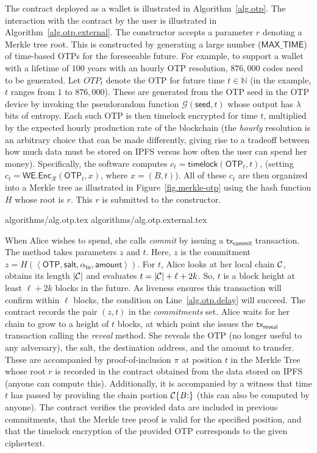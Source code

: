 The contract deployed as a wallet is illustrated in Algorithm~\ref{alg.otp}.
The interaction with the contract by the user is illustrated in Algorithm~\ref{alg.otp.external}.
The constructor accepts a parameter $r$
denoting a Merkle tree root. This is constructed by generating a large number ($\textsf{MAX\_TIME}$)
of time-based OTPs for the foreseeable future. For example, to support a wallet with
a lifetime of $100$ years with an hourly OTP resolution, $876{,}000$ codes need to
be generated. Let ${OTP}_t$ denote the OTP for future time $t \in \mathbb{N}$ (in
the example, $t$ ranges from $1$ to $876{,}000$). These are generated from
the OTP seed in the OTP device by invoking the pseudorandom function
$\mathcal{G}(\textsf{seed}, t)$ whose output has $\lambda$ bits of entropy.
Each such OTP is then timelock encrypted for time $t$, multiplied by the expected
hourly production rate of the blockchain (the \emph{hourly} resolution is an arbitrary
choice that can be made differently, giving rise to a tradeoff between how much
data must be stored on IPFS versus how often the user can spend her money).
Specifically, the software computes $c_t = \textsf{timelock}(\textsf{OTP}_t, t)$,
(setting $c_t = \textsf{WE.Enc}_\mathcal{R}(\textsf{OTP}_t, x)$, where $x = (B, t)$).
All of these $c_t$ are then organized into a Merkle tree as illustrated in
Figure~\ref{fig.merkle-otp}
using the hash function $H$ whose root is $r$. This $r$ is submitted
to the constructor.

{algorithms/alg.otp.tex}
{algorithms/alg.otp.external.tex}

When Alice wishes to spend, she calls \emph{commit} by issuing a
$\textsf{tx}_\textsf{commit}$ transaction. The
method takes parameters $z$ and $t$. Here, $z$ is the commitment
$z = H(\left<\textsf{OTP}, \textsf{salt}, \alpha_{\textsf{to}}, \textsf{amount}\right>)$.
For $t$, Alice looks at her local chain $\mathcal{C}$, obtains its length $|\mathcal{C}|$
and evaluates $t = |\mathcal{C}| + \ell + 2k$.
So, $t$ is a block height at least $\ell + 2k$ blocks in the future.
As liveness ensures this transaction will confirm within $\ell$ blocks,
the condition on Line~\ref{alg.otp.delay} will succeed.
The contract records the pair $(z, t)$ in the \emph{commitments} set.
Alice waits for her chain to grow to a height of $t$ blocks,
at which point she issues the $\textsf{tx}_\textsf{reveal}$ transaction
calling the \emph{reveal} method. She reveals
the OTP (no longer useful to any adversary), the salt,
the destination address, and the amount to transfer. These are accompanied
by proof-of-inclusion $\pi$ at position $t$ in the Merkle Tree whose root $r$
is recorded in the contract obtained from the data stored on IPFS
(anyone can compute this). Additionally, it is accompanied by a witness that
time $t$ has passed by providing the chain portion $\mathcal{C}\{B{:}\}$ (this can
also be computed by anyone). The contract verifies the provided
data are included in previous commitments, that the Merkle tree proof is
valid for the specified position, and that the timelock encryption of the
provided OTP corresponds to the given ciphertext.

